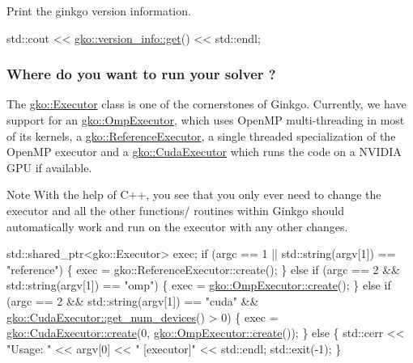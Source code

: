 Print the ginkgo version information.


\begin{DoxyCode}
std::cout << \hyperlink{classgko_1_1version__info_a6daeb8a087cfb57fa055526fc133d8eb}{gko::version\_info::get}() << std::endl;
\end{DoxyCode}


\label{_Wheredoyouwanttorunyoursolver}%
 \subsubsection*{Where do you want to run your solver ?}

The \hyperlink{classgko_1_1Executor}{gko\+::\+Executor} class is one of the cornerstones of Ginkgo. Currently, we have support for an \hyperlink{classgko_1_1OmpExecutor}{gko\+::\+Omp\+Executor}, which uses Open\+MP multi-\/threading in most of its kernels, a \hyperlink{classgko_1_1ReferenceExecutor}{gko\+::\+Reference\+Executor}, a single threaded specialization of the Open\+MP executor and a \hyperlink{classgko_1_1CudaExecutor}{gko\+::\+Cuda\+Executor} which runs the code on a N\+V\+I\+D\+IA G\+PU if available. \begin{DoxyNote}{Note}
With the help of C++, you see that you only ever need to change the executor and all the other functions/ routines within Ginkgo should automatically work and run on the executor with any other changes.
\end{DoxyNote}

\begin{DoxyCode}
std::shared\_ptr<gko::Executor> exec;
\textcolor{keywordflow}{if} (argc == 1 || std::string(argv[1]) == \textcolor{stringliteral}{"reference"}) \{
    exec = gko::ReferenceExecutor::create();
\} \textcolor{keywordflow}{else} \textcolor{keywordflow}{if} (argc == 2 && std::string(argv[1]) == \textcolor{stringliteral}{"omp"}) \{
    exec = \hyperlink{classgko_1_1OmpExecutor_a33ca05fdd0fc928ee262fc9425304874}{gko::OmpExecutor::create}();
\} \textcolor{keywordflow}{else} \textcolor{keywordflow}{if} (argc == 2 && std::string(argv[1]) == \textcolor{stringliteral}{"cuda"} &&
           \hyperlink{classgko_1_1CudaExecutor_aef0258494d14de0e56149b920c5173e5}{gko::CudaExecutor::get\_num\_devices}() > 0) \{
    exec = \hyperlink{classgko_1_1CudaExecutor_a2718a92034350650ef406ffdb60db090}{gko::CudaExecutor::create}(0, 
      \hyperlink{classgko_1_1OmpExecutor_a33ca05fdd0fc928ee262fc9425304874}{gko::OmpExecutor::create}());
\} \textcolor{keywordflow}{else} \{
    std::cerr << \textcolor{stringliteral}{"Usage: "} << argv[0] << \textcolor{stringliteral}{" [executor]"} << std::endl;
    std::exit(-1);
\}
\end{DoxyCode}


